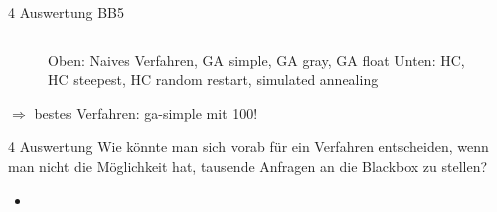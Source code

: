 \documentclass{ocbeameruni}
\begin{document}
\begin{frame}{4 Auswertung BB5}
\begin{center}
\begin{figure}
\begin{tabular}{|c|c|c|c|}
    \end{tabular}
    \caption{Oben: Naives Verfahren, GA simple, GA gray, GA float \hspace{\textwidth}Unten: HC, HC steepest, HC random restart, simulated annealing}
    \end{figure}
    $\Rightarrow$ bestes Verfahren: ga-simple mit 100!
    \end{center}
\end{frame}

\begin{frame}{4 Auswertung}
Wie könnte man sich vorab für ein Verfahren entscheiden, wenn man nicht die Möglichkeit hat,
tausende Anfragen an die Blackbox zu stellen?
    \begin{itemize}
    \item 
    \end{itemize}
\end{frame}
\end{document}
